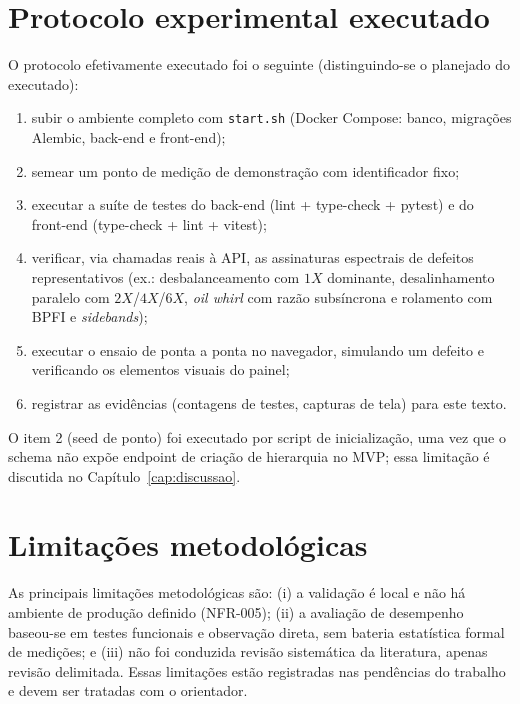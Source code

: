 \section{Protocolo experimental executado}

O protocolo efetivamente executado foi o seguinte (distinguindo-se o planejado
do executado):

\begin{enumerate}
  \item subir o ambiente completo com \texttt{start.sh} (Docker Compose: banco,
  migrações Alembic, back-end e front-end);
  \item semear um ponto de medição de demonstração com identificador fixo;
  \item executar a suíte de testes do back-end (lint + type-check + pytest) e
  do front-end (type-check + lint + vitest);
  \item verificar, via chamadas reais à API, as assinaturas espectrais de
  defeitos representativos (ex.: desbalanceamento com \(1X\) dominante,
  desalinhamento paralelo com \(2X\)/\(4X\)/\(6X\), \emph{oil whirl} com
  razão subsíncrona e rolamento com BPFI e \emph{sidebands});
  \item executar o ensaio de ponta a ponta no navegador, simulando um defeito
  e verificando os elementos visuais do painel;
  \item registrar as evidências (contagens de testes, capturas de tela) para
  este texto.
\end{enumerate}

O item 2 (seed de ponto) foi executado por script de inicialização, uma vez que
o schema não expõe endpoint de criação de hierarquia no MVP; essa limitação é
discutida no Capítulo~\ref{cap:discussao}.

\section{Limitações metodológicas}

As principais limitações metodológicas são: (i) a validação é local e não há
ambiente de produção definido (NFR-005); (ii) a avaliação de desempenho
baseou-se em testes funcionais e observação direta, sem bateria estatística
formal de medições; e (iii) não foi conduzida revisão sistemática da literatura,
apenas revisão delimitada. Essas limitações estão registradas nas pendências do
trabalho e devem ser tratadas com o orientador.

